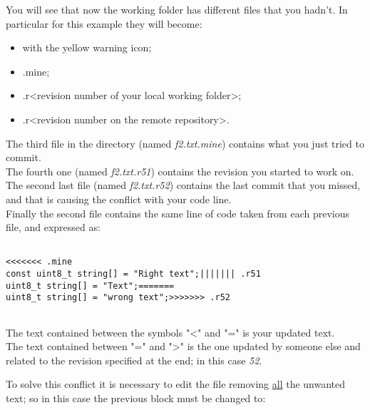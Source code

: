 \newpage


You will see that now the working folder has different files that you hadn't. In particular for this example they will become:


\begin{itemize}

	\item <file name> with the yellow warning icon;
	
	\item <file name>.mine;
	
	\item <file name>.r<revision number of your local working folder>;
	
	\item <file name>.r<revision number on the remote repository>.

\end{itemize}


The third file in the directory (named \textit{f2.txt.mine}) contains what you just tried to commit.\\


The fourth one (named \textit{f2.txt.r51}) contains the revision you started to work on.\\

The second last file (named \textit{f2.txt.r52}) contains the last commit that you missed, and that is causing the conflict with your code line.\\

Finally the second file contains the same line of code taken from each previous file, and expressed as:

\begin{verbatim}

<<<<<<< .mine
const uint8_t string[] = "Right text";||||||| .r51
uint8_t string[] = "Text";=======
uint8_t string[] = "wrong text";>>>>>>> .r52
    
\end{verbatim}

The text contained between the symbols "<" and "=" is your updated text.\\
The text contained between "=" and ">" is the one updated by someone else and related to the revision specified at the end; in this case \textit{52}.\newline

To solve this conflict it is necessary to edit the file removing \underline{all} the unwanted text; so in this case the previous block must be changed to:

